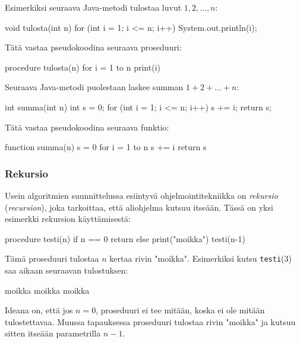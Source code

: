 Esimerkiksi seuraava Java-metodi tulostaa luvut $1,2,\dots,n$:

\begin{code}
void tulosta(int n) {
    for (int i = 1; i <= n; i++) {
        System.out.println(i);
    }
}
\end{code}

Tätä vastaa pseudokoodina seuraava proseduuri:

\begin{code}
procedure tulosta(n)
    for i = 1 to n
        print(i)
\end{code}

Seuraava Java-metodi puolestaan laskee summan $1+2+\dots+n$:

\begin{code}
int summa(int n) {
    int s = 0;
    for (int i = 1; i <= n; i++) {
        s += i;
    }
    return s;
}
\end{code}

Tätä vastaa pseudokoodina seuraava funktio:

\begin{code}
function summa(n)
    s = 0
    for i = 1 to n
        s += i
    return s
\end{code}

\subsubsection{Rekursio}


Usein algoritmien suunnittelussa esiintyvä ohjelmointitekniikka on
\emph{rekursio} (\emph{recursion}),
joka tarkoittaa, että aliohjelma kutsuu itseään.
Tässä on yksi esimerkki rekursion käyttämisestä:

\begin{code}
procedure testi(n)
    if n == 0
        return
    else
        print("moikka")
        testi(n-1)
\end{code}

Tämä proseduuri tulostaa $n$ kertaa rivin "moikka".
Esimerkiksi kutsu \texttt{testi}(3) saa aikaan seuraavan tulostuksen:

\begin{code}
moikka
moikka
moikka
\end{code}

Ideana on, että jos $n=0$, proseduuri ei tee mitään,
koska ei ole mitään tulostettavaa.
Muussa tapauksessa proseduuri tulostaa rivin "moikka"
ja kutsuu sitten itseään parametrilla $n-1$.

